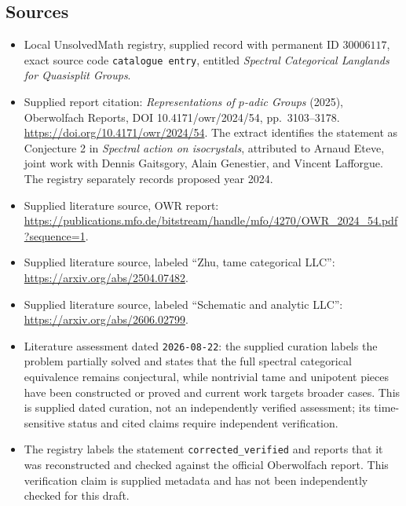 \documentclass[11pt]{article}
\begin{document}
\subsection{Sources}
\begin{itemize}
\item Local UnsolvedMath registry, supplied record with permanent ID \(30006117\), exact source code \texttt{catalogue entry}, entitled \emph{Spectral Categorical Langlands for Quasisplit Groups}.
\item Supplied report citation: \emph{Representations of \(p\)-adic Groups} (2025), Oberwolfach Reports, DOI 10.4171/owr/2024/54, pp.\ 3103--3178. \url{https://doi.org/10.4171/owr/2024/54}. The extract identifies the statement as Conjecture 2 in \emph{Spectral action on isocrystals}, attributed to Arnaud Eteve, joint work with Dennis Gaitsgory, Alain Genestier, and Vincent Lafforgue. The registry separately records proposed year 2024.
\item Supplied literature source, OWR report: \url{https://publications.mfo.de/bitstream/handle/mfo/4270/OWR_2024_54.pdf?sequence=1}.
\item Supplied literature source, labeled ``Zhu, tame categorical LLC'': \url{https://arxiv.org/abs/2504.07482}.
\item Supplied literature source, labeled ``Schematic and analytic LLC'': \url{https://arxiv.org/abs/2606.02799}.
\item Literature assessment dated \texttt{2026-08-22}: the supplied curation labels the problem partially solved and states that the full spectral categorical equivalence remains conjectural, while nontrivial tame and unipotent pieces have been constructed or proved and current work targets broader cases. This is supplied dated curation, not an independently verified assessment; its time-sensitive status and cited claims require independent verification.
\item The registry labels the statement \texttt{corrected\_verified} and reports that it was reconstructed and checked against the official Oberwolfach report. This verification claim is supplied metadata and has not been independently checked for this draft.
\end{itemize}
\end{document}

